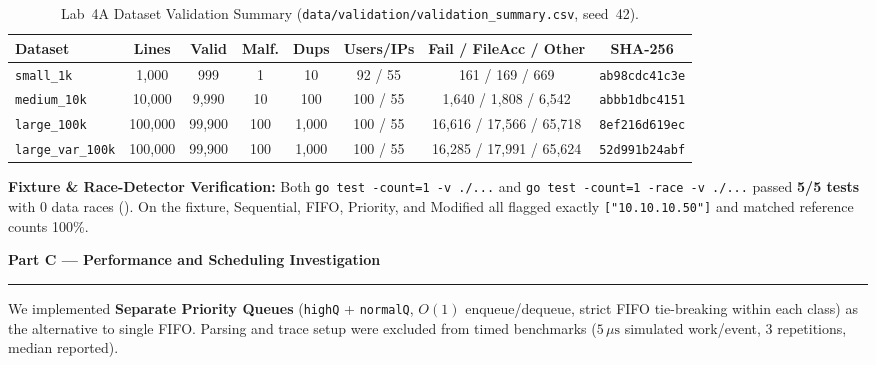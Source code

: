 \documentclass[11pt]{article}
\newcommand{\partheader}[1]{%
    \vspace{0.9em}%
    {\noindent\fontsize{13.5}{16}\selectfont\textbf{\color{accentblue}#1}\par}%
    \vspace{0.2em}\hrule\vspace{0.65em}%
}
\begin{document}
\begin{table}[htbp]
\centering
\caption{Lab~4A Dataset Validation Summary (\texttt{data/validation/validation\_summary.csv}, seed~42).}
\scriptsize
\setlength{\tabcolsep}{4pt}
\begin{tabular}{@{}lccccccc@{}}
\toprule
\textbf{Dataset} & \textbf{Lines} & \textbf{Valid} & \textbf{Malf.} & \textbf{Dups} & \textbf{Users/IPs} & \textbf{Fail / FileAcc / Other} & \textbf{SHA-256} \\
\midrule
\texttt{small\_1k} & 1,000 & 999 & 1 & 10 & 92 / 55 & 161 / 169 / 669 & \texttt{ab98cdc41c3e} \\
\texttt{medium\_10k} & 10,000 & 9,990 & 10 & 100 & 100 / 55 & 1,640 / 1,808 / 6,542 & \texttt{abbb1dbc4151} \\
\texttt{large\_100k} & 100,000 & 99,900 & 100 & 1,000 & 100 / 55 & 16,616 / 17,566 / 65,718 & \texttt{8ef216d619ec} \\
\texttt{large\_var\_100k} & 100,000 & 99,900 & 100 & 1,000 & 100 / 55 & 16,285 / 17,991 / 65,624 & \texttt{52d991b24abf} \\
\bottomrule
\end{tabular}
\end{table}

\textbf{Fixture \& Race-Detector Verification:} Both \texttt{go test -count=1 -v ./...} and \texttt{go test -count=1 -race -v ./...} passed \textbf{5/5 tests} with 0 data races (). On the fixture, Sequential, FIFO, Priority, and Modified all flagged exactly \texttt{["10.10.10.50"]} and matched reference counts 100\%.

\partheader{Part C --- Performance and Scheduling Investigation}

We implemented \textbf{Separate Priority Queues} (\texttt{highQ} + \texttt{normalQ}, $O(1)$ enqueue/dequeue, strict FIFO tie-breaking within each class) as the alternative to single FIFO. Parsing and trace setup were excluded from timed benchmarks ($5\,\mu\text{s}$ simulated work/event, 3 repetitions, median reported).
\end{document}
